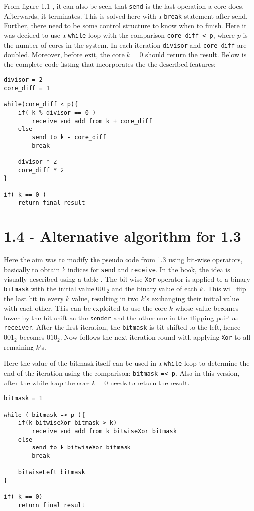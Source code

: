 \documentclass[a4paper,11pt,twoside]{article}
\begin{document}
From figure 1.1 \cite[p.5]{pacheco2011}, it can also be seen that \verb+send+ is the last operation a core does. Afterwards, it terminates. This is solved here with a \verb+break+ statement after send. Further, there need to be some control structure to know when to finish. Here it was decided to use a \verb+while+ loop with the comparison \verb+core_diff < p+, where $p$ is the number of cores in the system. In each iteration \verb+divisor+ and \verb+core_diff+ are doubled. Moreover, before exit, the core $k = 0$ should return the result. Below is the complete code listing that incorporates the the described features:

\begin{verbatim}
divisor = 2
core_diff = 1

while(core_diff < p){
    if( k % divisor == 0 )
        receive and add from k + core_diff
    else 
        send to k - core_diff
        break

    divisor * 2
    core_diff * 2
}

if( k == 0 )
    return final result
\end{verbatim}

\section{1.4 - Alternative algorithm for 1.3}
Here the aim was to modify the pseudo code from 1.3 using bit-wise operators, basically to obtain $k$ indices for \verb+send+ and \verb+receive+. In the book, the idea is visually described using a table \cite[p.13]{pacheco2011}. The bit-wise \verb+Xor+ operator is applied to a binary \verb+bitmask+ with the initial value $001_{2}$ and the binary value of each $k$. This will flip the last bit in every $k$ value, resulting in two $k$'s exchanging their initial value with each other. This can be exploited to use the core $k$ whose value becomes lower by the bit-shift as the \verb+sender+ and the other one in the `flipping pair' as \verb+receiver+. After the first iteration, the \verb+bitmask+ is bit-shifted to the left, hence $001_{2}$ becomes $010_{2}$. Now follows the next iteration round with applying \verb+Xor+ to all remaining $k$'s.      

Here the value of the bitmask itself can be used in a \verb+while+ loop to determine the end of the iteration using the comparison: \verb+bitmask =< p+. Also in this version, after the while loop the core $k = 0$ needs to return the result.

\begin{verbatim}
bitmask = 1

while ( bitmask =< p ){
    if(k bitwiseXor bitmask > k)
        receive and add from k bitwiseXor bitmask
    else
        send to k bitwiseXor bitmask
        break

    bitwiseLeft bitmask
}

if( k == 0)
    return final result

\end{verbatim}
\end{document}

